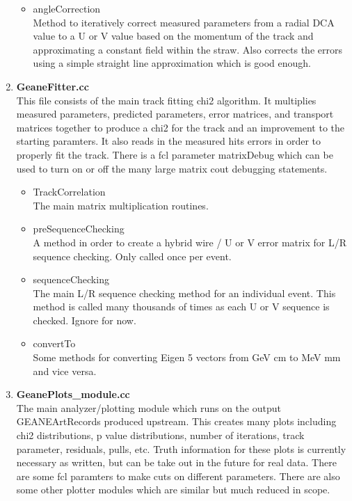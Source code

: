\documentclass{article}
\begin{document}
\begin{enumerate}
\begin{itemize}
          \item{angleCorrection} \\
          Method to iteratively correct measured parameters from a radial DCA value to a U or V value based on the momentum of the track and approximating a constant field within the straw. Also corrects the errors using a simple straight line approximation which is good enough.

        \end{itemize}

      \item{\bf{GeaneFitter.cc}} \\
      This file consists of the main track fitting chi2 algorithm. It multiplies measured parameters, predicted parameters, error matrices, and transport matrices together to produce a chi2 for the track and an improvement to the starting paramters. It also reads in the measured hits errors in order to properly fit the track. There is a fcl parameter matrixDebug which can be used to turn on or off the many large matrix cout debugging statements.

        \begin{itemize}

          \item{TrackCorrelation} \\
          The main matrix multiplication routines.

          \item{preSequenceChecking} \\
          A method in order to create a hybrid wire / U or V error matrix for L/R sequence checking. Only called once per event.

          \item{sequenceChecking} \\ 
          The main L/R sequence checking method for an individual event. This method is called many thousands of times as each U or V sequence is checked. Ignore for now.

          \item{convertTo} \\
          Some methods for converting Eigen 5 vectors from GeV cm to MeV mm and vice versa.

        \end{itemize}

      \item{\bf{GeanePlots\_module.cc}} \\
      The main analyzer/plotting module which runs on the output GEANEArtRecords produced upstream. This creates many plots including chi2 distributions, p value distributions, number of iterations, track parameter, residuals, pulls, etc. Truth information for these plots is currently necessary as written, but can be take out in the future for real data. There are some fcl paramters to make cuts on different parameters. There are also some other plotter modules which are similar but much reduced in scope.


\end{enumerate}
\end{document}
